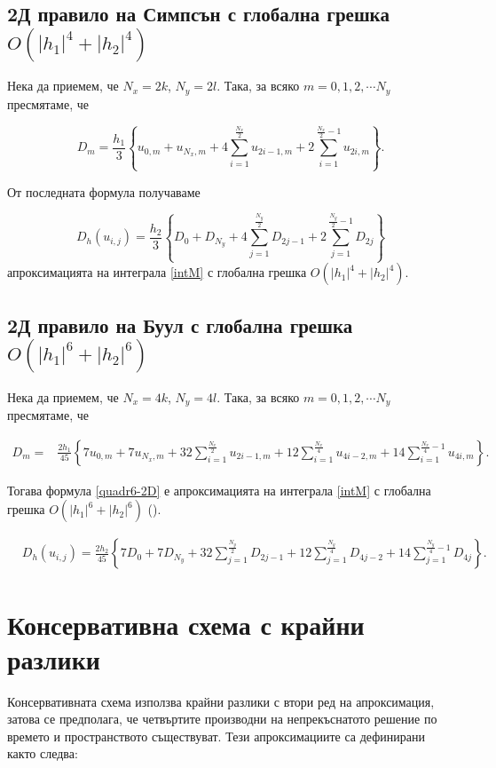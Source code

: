 \documentclass{article}
\begin{document}
\subsection{ 2Д правило на Симпсън с глобална грешка $O(|h_1|^4+|h_2|^4)$}

Нека да приемем, че $N_x=2k$, $N_y=2 l$. Така, за всяко $m=0,1,2,\cdots N_y$ пресмятаме, че

$$D_m= \frac{h_1 }{3} 
\left\{ u_{0,m}+u_{N_x,m}+ 4 \sum_{i=1}^{\frac{N_x}{2}}   u_{2i-1,m}
 +2 \sum_{i=1}^{\frac{N_x}{2}-1} u_{2i,m} \right\}.$$


От последната формула получаваме

\begin{equation}\label{quadr4}
D_h(u_{i,j}) =\frac{h_2 }{3} 
\left\{ D_{0}+D_{N_y}+ 4 \sum_{j=1}^{\frac{N_y}{2}}   D_{2j-1}
 +2 \sum_{j=1}^{{\frac{N_y}{2}}-1} D_{2j} \right\}
\end{equation}
апроксимацията на интеграла \eqref{intM} с глобална грешка $O(|h_1|^4+|h_2|^4)$.


\subsection{ 2Д правило на Буул с глобална грешка $O(|h_1|^6+|h_2|^6)$}

Нека да приемем, че $N_x=4k$, $N_y=4 l$. Така, за всяко $m=0,1,2,\cdots N_y$ пресмятаме, че

\begin{align*}
D_m =& \frac{2h_1}{45} 
\left\{
7u_{0,m}+7u_{N_x,m}+32 \sum_{i=1}^{\frac{N_x}{2}}u_{2i-1,m}
+12\sum_{i=1}^{\frac{N_x}{4}}u_{4i-2,m}
+14 \sum_{i=1}^{\frac{N_x}{4}-1}u_{4i,m}
\right\}.
\end{align*}

Тогава формула \eqref{quadr6-2D} е апроксимацията на интеграла \eqref{intM} с глобална грешка $O(|h_1|^6+|h_2|^6)$ (\cite{boole}).

\begin{align}\label{quadr6-2D}
&D_h(u_{i,j})  =
\frac{2h_2}{45} 
\left\{
7D_{0}+7D_{N_y}+32 \sum_{j=1}^{\frac{N_y}{2}}D_{2j-1}
+12\sum_{j=1}^{\frac{N_y}{4}}D_{4j-2}
+14 \sum_{j=1}^{\frac{N_y}{4}-1}D_{4j}
\right\}.
\end{align}

\section{ Консервативна схема с крайни разлики }
Консервативната схема използва крайни разлики с втори ред на апроксимация, затова се предполага, че четвъртите производни на непрекъснатото решение по времето и пространството съществуват.  Тези апроксимациите са дефинирани както следва:
\end{document}
